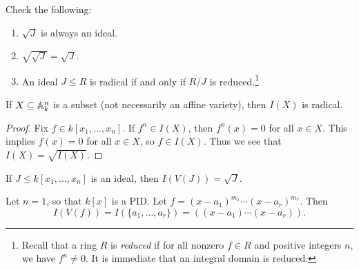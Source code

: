 \begin{exercise}
  Check the following:
  \begin{enumerate}
    \item $\sqrt{J}$ is always an ideal.
    \item $\sqrt{\sqrt{J}} = \sqrt{J}$.
    \item An ideal $J \le R$ is radical
      if and only if $R / J$ is
      reduced.\footnote{Recall that a ring $R$ is \emph{reduced} if for all nonzero $f \in R$ and positive integers $n$, we have $f^n \ne 0$. It is immediate that an integral domain is reduced.}
  \end{enumerate}
\end{exercise}

\begin{prop}
  If $X \subseteq \mathbb{A}^n_k$ is a subset
  (not necessarily an affine variety),
  then $I(X)$ is radical.
\end{prop}

\begin{proof}
  Fix $f \in k[x_1, \dots, x_n]$. If
  $f^n \in I(X)$, then $f^n(x) = 0$ for
  all $x \in X$. This implies
  $f(x) = 0$ for all $x \in X$, so
  $f \in I(X)$. Thus we see that
  $I(X) = \sqrt{I(X)}$.
\end{proof}

\begin{theorem}
  \label{thm:hilbert-nullstellensatz}
  If $J \le k[x_1, \dots, x_n]$ is an
  ideal, then $I(V(J)) = \sqrt{J}$.
\end{theorem}

\begin{example}
  Let $n = 1$, so that $k[x]$ is a PID. Let $f = (x - a_1)^{m_1} \cdots (x - a_r)^{m_r}$.
  Then
  \[
    I(V(f)) = I(\{a_1, \dots, a_r\})
    = ((x - a_1) \cdots (x - a_r)).
  \]
\end{example}

